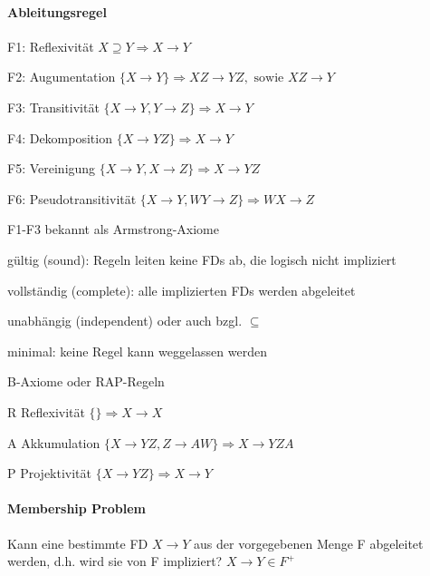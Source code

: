 \documentclass[a4paper]{article}
\begin{document}
\begin{multicols}{3}
    \paragraph{Ableitungsregel}
    \begin{itemize*}
        \item F1: Reflexivität $X\supseteq Y \Rightarrow X\rightarrow Y$
        \item F2: Augumentation $\{X\rightarrow Y\}\Rightarrow XZ\rightarrow YZ, \text{ sowie } XZ\rightarrow Y$
        \item F3: Transitivität $\{ X\rightarrow Y,Y\rightarrow Z\}\Rightarrow X\rightarrow Y$
        \item F4: Dekomposition $\{X\rightarrow YZ\} \Rightarrow X\rightarrow Y$
        \item F5: Vereinigung $\{X\rightarrow Y, X\rightarrow Z\}\Rightarrow X\rightarrow YZ$
        \item F6: Pseudotransitivität $\{X\rightarrow Y, WY\rightarrow Z\}\Rightarrow WX\rightarrow Z$
    \end{itemize*}

    F1-F3 bekannt als Armstrong-Axiome
    \begin{itemize*}
        \item gültig (sound): Regeln leiten keine FDs ab, die logisch nicht impliziert
        \item vollständig (complete): alle implizierten FDs werden abgeleitet
        \item unabhängig (independent) oder  auch bzgl. $\subseteq$
        \item minimal: keine Regel kann weggelassen werden
    \end{itemize*}

    B-Axiome oder RAP-Regeln
    \begin{itemize*}
        \item R Reflexivität $\{\}\Rightarrow X\rightarrow X$
        \item A Akkumulation $\{X\rightarrow YZ, Z\rightarrow AW\}\Rightarrow X\rightarrow YZA$
        \item P Projektivität $\{X\rightarrow YZ\}\Rightarrow X\rightarrow Y$
    \end{itemize*}

    \paragraph{Membership Problem} Kann eine bestimmte FD $X\rightarrow Y$ aus der vorgegebenen Menge F abgeleitet werden, d.h. wird sie von F impliziert? $X\rightarrow Y \in F^+$


\end{multicols}
\end{document}
